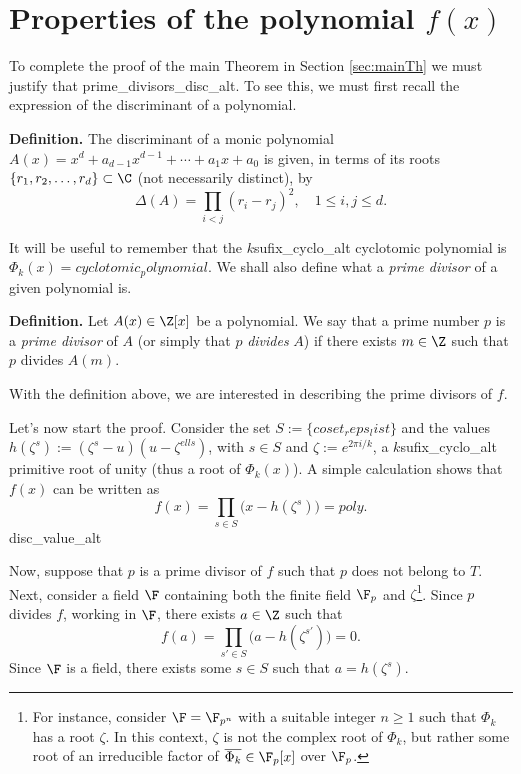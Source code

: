 \section{Properties of the polynomial \texorpdfstring{$f(x)$}{fx}}\label{sec:properties}
 
To complete the proof of the main Theorem in Section \ref{sec:mainTh} we must justify that {prime_divisors_disc_alt}. To see this, we must first recall the expression of the discriminant of a polynomial.

\textbf{Definition.} The discriminant of a monic polynomial $A(x)=x^d+a_{d-1}x^{d-1}+\cdots+a_1x+a_0$ is given, in terms of its roots $\{r_1,r_2,\dots,r_d\}\subset\C$ (not necessarily distinct), by
\begin{equation}\label{eq:discrim}
	\Delta(A)=\prod_{i<j}(r_i-r_j)^2, \quad 1\leqslant i,j\leqslant d.
\end{equation}

It will be useful to remember that the ${k}${sufix_cyclo_alt} cyclotomic polynomial is $\Phi_{{k}}(x)={cyclotomic_polynomial}$. We shall also define what a \emph{prime divisor} of a given polynomial is. 

\textbf{Definition.} Let $A(x)\in\Z[x]$ be a polynomial. We say that a prime number $p$ is a \emph{prime divisor} of $A$ (or simply that $p$ \emph{divides} $A$) if there exists $m\in\Z$ such that $p$ divides $A(m)$.

With the definition above, we are interested in describing the prime divisors of $f$.

Let's now start the proof. Consider the set $S:=\{{coset_reps_list}\}$ and the values $h(\zeta^{s}):=(\zeta^{s}-{u})({u}-\zeta^{{ell}s})$, with $s\in S$ and $\zeta:=e^{2\pi i/{{k}}}$, a ${k}${sufix_cyclo_alt} primitive root of unity (thus a root of $\Phi_{{k}}(x)$). A simple calculation shows that $f(x)$ can be written as
\begin{equation*}
f(x)=\prod_{s\in S}\big(x-h(\zeta^{s})\big)={poly}.
\end{equation*}
{disc_value_alt}

Now, suppose that $p$ is a prime divisor of $f$ such that $p$ does not belong to $T$. Next, consider a field $\F$ containing both the finite field $\F_p$ and $\zeta$\footnote{For instance, consider $\F=\F_{p^n}$ with a suitable integer $n\geqslant 1$ such that $\Phi_{{k}}$ has a root $\zeta$. In this context, $\zeta$ is not the complex root of $\Phi_{{k}}$, but rather some root of an irreducible factor of $\overline{\Phi_{{k}}}\in\F_p[x]$ over $\F_p$.}. Since $p$ divides $f$, working in $\F$, there exists $a\in\Z$ such that 
\begin{equation*}
f(a)=\prod_{s'\in S}\big(a-h(\zeta^{s'})\big)=0.
\end{equation*}
Since $\F$ is a field, there exists some $s\in S$ such that $a=h(\zeta^{s})$.

